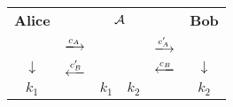 \begin{tabular}{cC{1cm}r|lC{1cm}c}
    \textbf{Alice} &  &  & & \textbf{Bob}\\
    & $\xlongrightarrow{c_A}$ &  &  & $\xlongrightarrow{c_A'}$ & \\
    $\downarrow$ & $\xlongleftarrow{c_B'}$ & & & $\xlongleftarrow{c_B}$ & $\downarrow$\\
    $k_1$ & & $k_1$ & $k_2$ & & $k_2$ \\
\end{tabular}